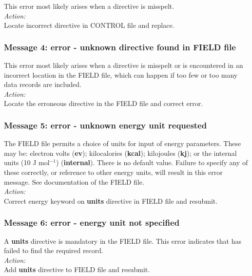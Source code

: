 This error most likely arises when a directive is misspelt.\\

\noindent
{\em Action:} \\
Locate incorrect directive in CONTROL file and replace.

\subsubsection*{Message 4: error - unknown directive found in FIELD
file}

This error most likely arises when a directive is misspelt or is
encountered in an incorrect location in the FIELD file, which can
happen if too few or too many data records are included.\\

\noindent
{\em Action:} \\ Locate the erroneous directive in the FIELD file and
correct error.

\subsubsection*{Message 5: error - unknown energy unit requested}

The \D{} FIELD file permits a choice of units for input of energy
parameters. These may be: electron volts ({\bf ev}); kilocalories
({\bf kcal}); kilojoules ({\bf kj}); or the \D{} internal units (10 J mol$^{-1}$)
({\bf internal}). There is no default value. Failure to specify
any of these correctly, or reference to other energy units, will
result in this error message. See documentation of the FIELD file.\\

\noindent
{\em Action:} \\ 
Correct energy keyword on {\bf units} directive in
FIELD file and resubmit.

\subsubsection*{Message 6: error - energy unit not specified}

A {\bf units} directive is mandatory in the FIELD file. This error
indicates that \D{} \newline has failed to find the required record.\\

\noindent
{\em Action:} \\
Add {\bf units} directive to FIELD file and resubmit.

